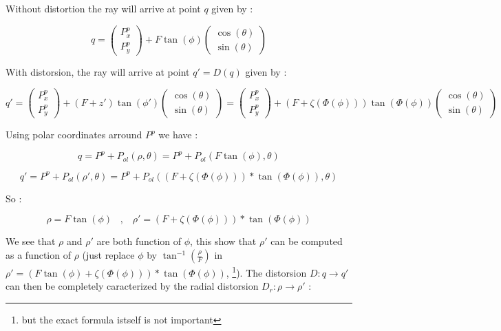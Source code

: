 Without distortion the ray will arrive at point $q$  given by :

\begin{equation}
	q =     \begin{pmatrix} P^p_x \\ P^p_y \end{pmatrix} +  F \tan(\phi)   \begin{pmatrix} \cos(\theta) \\ \sin(\theta) \end{pmatrix} 
\end{equation}

With distorsion, the ray will arrive at point $q' = D(q)$ given by :

\begin{equation}
	q' =     \begin{pmatrix} P^p_x \\ P^p_y \end{pmatrix} +  (F+z') \tan(\phi')   \begin{pmatrix} \cos(\theta) \\ \sin(\theta) \end{pmatrix} 
		=     \begin{pmatrix} P^p_x \\ P^p_y \end{pmatrix} +  (F+\zeta(\Phi(\phi))) \tan(\Phi(\phi))   \begin{pmatrix} \cos(\theta) \\ \sin(\theta) \end{pmatrix} 
\end{equation}

Using polar coordinates arround $P^p$ we have :

\begin{equation}
	q = P^p + P_{ol}(\rho,\theta) =  P^p+  P_{ol} ( F \tan(\phi), \theta) \label{PolInit} 
\end{equation}

\begin{equation}
	q' = P^p+   P_{ol}(\rho',\theta) =  P^p+  P_{ol}( (F+\zeta(\Phi(\phi))) * \tan(\Phi(\phi)), \theta) \label{PolDist}
\end{equation}

So : 

\begin{equation}
       \rho = F \tan(\phi)   \;\;\; , \;\;\;  \rho' = (F+\zeta(\Phi(\phi))) * \tan(\Phi(\phi))   \label{RhoPhi}
\end{equation}

We see that $\rho$ and $\rho'$ are both function of $\phi$, this show that $\rho'$ can be
computed as a function of $\rho$ (just replace $\phi$ by $\tan^{-1}(\frac{\rho}{F})$ in  $\rho'= (F \tan(\phi) +\zeta(\Phi(\phi))) * \tan(\Phi(\phi))$,
\footnote{but the exact formula istself is not important}).
The distorsion $D : q \rightarrow q' $ can then be completely caracterized by the radial distorsion
$D_r : \rho \rightarrow  \rho'$ :

